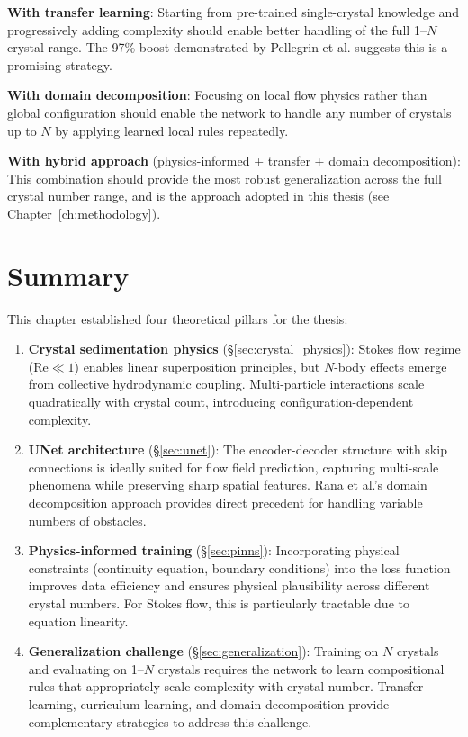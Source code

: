 \textbf{With transfer learning}: Starting from pre-trained single-crystal knowledge and progressively adding complexity should enable better handling of the full 1--$N$ crystal range. The 97\% boost demonstrated by Pellegrin et al. \cite{pellegrin2022transfer} suggests this is a promising strategy.

\textbf{With domain decomposition}: Focusing on local flow physics rather than global configuration should enable the network to handle any number of crystals up to $N$ by applying learned local rules repeatedly.

\textbf{With hybrid approach} (physics-informed + transfer + domain decomposition): This combination should provide the most robust generalization across the full crystal number range, and is the approach adopted in this thesis (see Chapter~\ref{ch:methodology}).

\section{Summary}
\label{sec:theory_summary}

This chapter established four theoretical pillars for the thesis:

\begin{enumerate}
    \item \textbf{Crystal sedimentation physics} (\S\ref{sec:crystal_physics}): Stokes flow regime ($\text{Re} \ll 1$) enables linear superposition principles, but $N$-body effects emerge from collective hydrodynamic coupling. Multi-particle interactions scale quadratically with crystal count, introducing configuration-dependent complexity.

    \item \textbf{UNet architecture} (\S\ref{sec:unet}): The encoder-decoder structure with skip connections is ideally suited for flow field prediction, capturing multi-scale phenomena while preserving sharp spatial features. Rana et al.'s \cite{rana2024scalable_cnn} domain decomposition approach provides direct precedent for handling variable numbers of obstacles.

    \item \textbf{Physics-informed training} (\S\ref{sec:pinns}): Incorporating physical constraints (continuity equation, boundary conditions) into the loss function improves data efficiency and ensures physical plausibility across different crystal numbers. For Stokes flow, this is particularly tractable due to equation linearity.

    \item \textbf{Generalization challenge} (\S\ref{sec:generalization}): Training on $N$ crystals and evaluating on 1--$N$ crystals requires the network to learn compositional rules that appropriately scale complexity with crystal number. Transfer learning, curriculum learning, and domain decomposition provide complementary strategies to address this challenge.
\end{enumerate}

